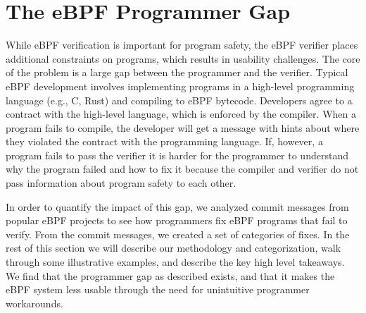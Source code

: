 \section{The eBPF Programmer Gap}
\label{sec:motivation}

While eBPF verification is important for program safety, the eBPF verifier
    places additional constraints on programs, which results in usability challenges.
The core of the problem is a large gap between the programmer and the
    verifier.
Typical eBPF development involves implementing programs in a high-level
    programming language (e.g., C, Rust) and compiling to eBPF bytecode.
Developers agree to a contract with the high-level language, which is
    enforced by the compiler.
When a program fails to compile, the developer will get a message with
    hints about where they violated
    the contract with the programming language.
If, however, a program fails to pass the verifier it is harder for the programmer
    to understand why the program failed and how to fix it because the compiler
    and verifier do not pass information about program safety to each other.

In order to quantify the impact of this gap,
    we analyzed commit messages from popular eBPF projects to see how programmers fix
    eBPF programs that fail to verify.
From the commit messages, we created a set of categories of fixes.
In the rest of this section we will describe our methodology and categorization, walk through some illustrative examples, and describe the key high level takeaways.
We find that the programmer gap as described exists, and that it makes the eBPF system less usable through the need for unintuitive programmer workarounds.




